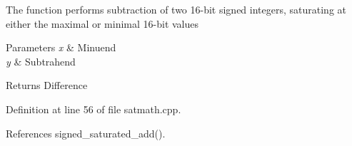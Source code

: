 The function performs subtraction of two 16-\/bit signed integers, saturating at either the maximal or minimal 16-\/bit values 
\begin{DoxyParams}{Parameters}
{\em x} & Minuend \\
\hline
{\em y} & Subtrahend \\
\hline
\end{DoxyParams}
\begin{DoxyReturn}{Returns}
Difference 
\end{DoxyReturn}


Definition at line 56 of file satmath.\-cpp.



References signed\-\_\-saturated\-\_\-add().

